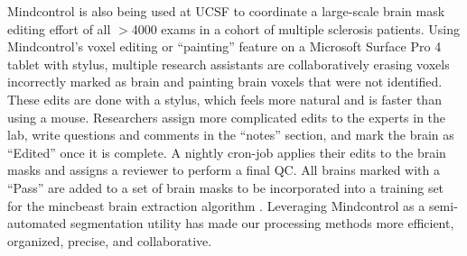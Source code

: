 
Mindcontrol is also being used at UCSF to coordinate a large-scale brain mask editing effort of all $>$4000 exams in a cohort of multiple sclerosis patients. Using Mindcontrol's voxel editing or ``painting'' feature on a Microsoft Surface Pro 4 tablet with stylus, multiple research assistants are collaboratively erasing voxels incorrectly marked as brain and painting brain voxels that were not identified.  These edits are done with a stylus, which feels more natural and is faster than using a mouse. Researchers assign more complicated edits to the experts in the lab, write questions and comments in the ``notes'' section, and mark the brain as ``Edited'' once it is complete. A nightly cron-job applies their edits to the brain masks and assigns a reviewer to perform a final QC. All brains marked with a ``Pass'' are added to a set of brain masks to be incorporated into a training set for the mincbeast brain extraction algorithm \cite{eskildsen2012beast}. Leveraging Mindcontrol as a semi-automated segmentation utility has made our processing methods more efficient, organized, precise, and collaborative.